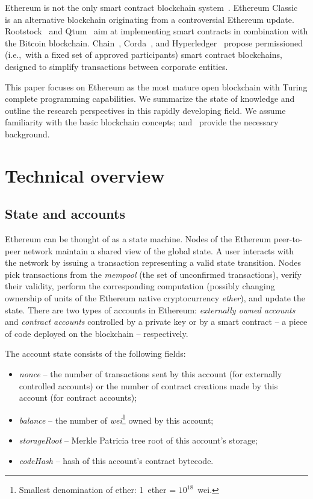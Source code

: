 Ethereum is not the only smart contract blockchain system~\cite{Bartoletti2017}.
Ethereum Classic~\cite{EthereumClassic} is an alternative blockchain originating from a controversial Ethereum update.
Rootstock~\cite{Rootstock} and Qtum~\cite{Qtum} aim at implementing smart contracts in combination with the Bitcoin blockchain.
Chain~\cite{Chain}, Corda~\cite{Corda}, and Hyperledger~\cite{Hyperledger} propose permissioned (i.e.,~with a fixed set of approved participants) smart contract blockchains, designed to simplify transactions between corporate entities.

This paper focuses on Ethereum as the most mature open blockchain with Turing complete programming capabilities.
We summarize the state of knowledge and outline the research perspectives in this rapidly developing field.
We assume familiarity with the basic blockchain concepts; \cite{Bonneau2015} and~\cite{Tschorsch2016} provide the necessary background.

\section{Technical overview}

\subsection{State and accounts}
Ethereum can be thought of as a state machine.
Nodes of the Ethereum peer-to-peer network maintain a shared view of the global state.
A user interacts with the network by issuing a transaction representing a valid state transition.
Nodes pick transactions from the \emph{mempool} (the set of unconfirmed transactions), verify their validity, perform the corresponding computation (possibly changing ownership of units of the Ethereum native cryptocurrency \emph{ether}), and update the state.
There are two types of accounts in Ethereum: \emph{externally owned accounts} and \emph{contract accounts} controlled by a private key or by a smart contract -- a piece of code deployed on the blockchain -- respectively.

The account state consists of the following fields:
\begin{itemize}
	\item \emph{nonce} -- the number of transactions sent by this account (for externally controlled accounts) or the number of contract creations made by this account (for contract accounts);
	\item \emph{balance} -- the number of \emph{wei}\footnote{Smallest denomination of ether: 1~ether = $10^{18}$~wei.} owned by this account;
	\item \emph{storageRoot} -- Merkle Patricia tree root of this account's storage;
	\item \emph{codeHash} -- hash of this account's contract bytecode.
\end{itemize}

